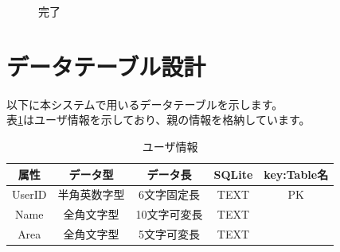 \documentclass[a4j]{jarticle}
\begin{document}
\begin{figure}[H]
    \begin{center}
    \caption {完了}
    \label{check}
    \end{center}
\end{figure}

\newpage
\section{データテーブル設計}

以下に本システムで用いるデータテーブルを示します。\\
表\ref{tbl: user}はユーザ情報を示しており、親の情報を格納しています。\\

\begin{table}[H]
    \caption{ユーザ情報}
    \label{tbl: user}
    \begin{center}
        \begin{tabular}{|c|c|c|c|c|} \hline
            属性 & データ型 & データ長 & SQLite & key:Table名\\ \hline \hline
            UserID & 半角英数字型 & 6文字固定長 & TEXT & PK\\ \hline
            Name & 全角文字型 & 10文字可変長 & TEXT & \\ \hline
            Area & 全角文字型 & 5文字可変長 & TEXT & \\ \hline
        \end{tabular}
    \end{center}
\end{table}
\end{document}
